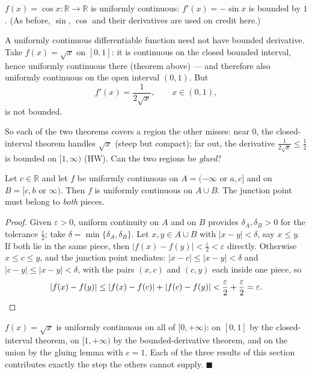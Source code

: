 \documentclass[11pt]{report}
\begin{document}
\begin{exbox}[Cosine]
$f(x) = \cos x: \mathbb{R} \to \mathbb{R}$ is uniformly continuous: $f'(x) = -\sin x$ is bounded by $1$. (As before, $\sin$, $\cos$ and their derivatives are used on credit here.)
\end{exbox}

\begin{rembox}
A uniformly continuous differentiable function need not have bounded derivative. Take $f(x) = \sqrt{x}$ on $[0,1]$: it is continuous on the closed bounded interval, hence uniformly continuous there (theorem above) --- and therefore also uniformly continuous on the open interval $(0,1)$. But
\[
f'(x) = \frac{1}{2\sqrt x}, \qquad x \in (0,1),
\]
is not bounded.
\end{rembox}

So each of the two theorems covers a region the other misses: near $0$, the closed-interval theorem handles $\sqrt x$ (steep but compact); far out, the derivative $\tfrac{1}{2\sqrt x} \leq \tfrac12$ is bounded on $[1, \infty)$ (HW). Can the two regions be \emph{glued}?

\begin{propbox}
Let $c \in \mathbb{R}$ and let $f$ be uniformly continuous on $A = (-\infty \text{ or } a, c]$ and on $B = [c, b \text{ or } \infty)$. Then $f$ is uniformly continuous on $A \cup B$. The junction point must belong to \emph{both} pieces.
\end{propbox}

\begin{proof}
Given $\varepsilon > 0$, uniform continuity on $A$ and on $B$ provides $\delta_A, \delta_B > 0$ for the tolerance $\tfrac\varepsilon2$; take $\delta = \min\{\delta_A, \delta_B\}$. Let $x, y \in A \cup B$ with $|x - y| < \delta$, say $x \leq y$. If both lie in the same piece, then $|f(x) - f(y)| < \tfrac\varepsilon2 < \varepsilon$ directly. Otherwise $x \leq c \leq y$, and the junction point mediates: $|x - c| \leq |x - y| < \delta$ and $|c - y| \leq |x-y| < \delta$, with the pairs $(x, c)$ and $(c, y)$ each inside one piece, so
\[
|f(x) - f(y)| \leq |f(x) - f(c)| + |f(c) - f(y)| < \frac\varepsilon2 + \frac\varepsilon2 = \varepsilon. \qedhere
\]
\end{proof}

\begin{exbox}
$f(x) = \sqrt x$ is uniformly continuous on all of $[0, +\infty)$: on $[0,1]$ by the closed-interval theorem, on $[1, +\infty)$ by the bounded-derivative theorem, and on the union by the gluing lemma with $c = 1$. Each of the three results of this section contributes exactly the step the others cannot supply. \hfill $\blacksquare$
\end{exbox}
\end{document}
